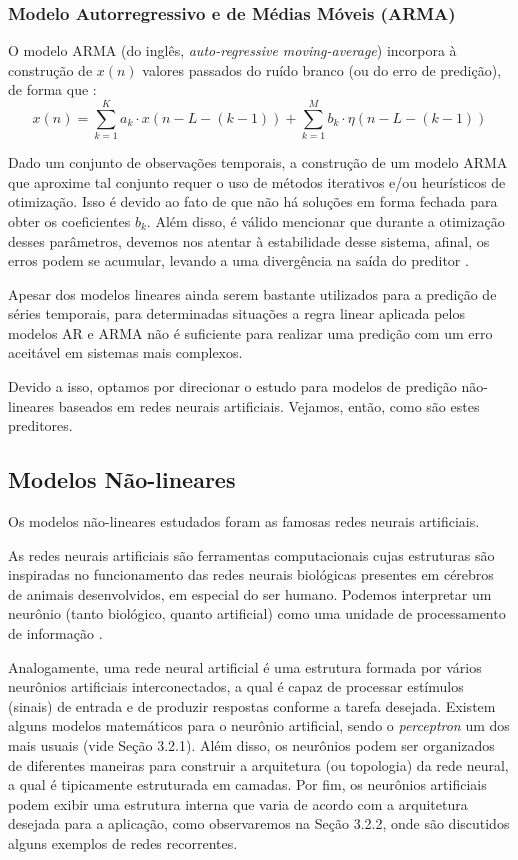 \documentclass[a4paper, 12pt]{article}
\begin{document}
\subsubsection{Modelo Autorregressivo e de Médias Móveis (ARMA)}

O modelo ARMA (do inglês, \textit{auto-regressive moving-average}) incorpora à construção de $x(n)$ valores passados do ruído branco (ou do erro de predição), de forma que \cite{box2015time}:
\begin{equation}
x(n) = \sum_{k = 1}^{K} a_{k} \cdot x(n - L - (k-1)) + \sum_{k=1}^{M} b_{k} \cdot \eta(n - L - (k-1))
\end{equation} 

Dado um conjunto de observações temporais, a construção de um modelo ARMA que aproxime tal conjunto requer o uso de métodos iterativos e/ou heurísticos de otimização. Isso é devido ao fato de que não há soluções em forma fechada para obter os coeficientes $b_k$. Além disso, é válido mencionar que durante a otimização desses parâmetros, devemos nos atentar à estabilidade desse sistema, afinal, os erros podem se acumular, levando a uma divergência na saída do preditor \cite{box2015time}.

Apesar dos modelos lineares ainda serem bastante utilizados para a predição de séries temporais, para determinadas situações a regra linear aplicada pelos modelos AR e ARMA não é suficiente para realizar uma predição com um erro aceitável em sistemas mais complexos. 

Devido a isso, optamos por direcionar o estudo para modelos de predição não-lineares baseados em redes neurais artificiais. Vejamos, então, como são estes preditores. 

\subsection{Modelos Não-lineares}

Os modelos não-lineares estudados foram as famosas redes neurais artificiais.

As redes neurais artificiais são ferramentas computacionais cujas estruturas são inspiradas no funcionamento das redes neurais biológicas presentes em cérebros de animais desenvolvidos, em especial do ser humano. Podemos interpretar um neurônio (tanto biológico, quanto artificial) como uma unidade de processamento de informação \cite{haykin2010neural}. 

Analogamente, uma rede neural artificial é uma estrutura formada por vários neurô\-nios artificiais interconectados, a qual é capaz de processar estímulos (sinais) de entrada e de produzir respostas conforme a tarefa desejada. Existem alguns modelos matemáticos para o neurônio artificial, sendo o \textit{perceptron} um dos mais usuais (vide Seção 3.2.1). Além disso, os neurônios podem ser organizados de diferentes maneiras para construir a arquitetura (ou topologia) da rede neural, a qual é tipicamente estruturada em camadas. Por fim, os neurônios artificiais podem exibir uma estrutura interna que varia de acordo com a arquitetura desejada para a aplicação, como observaremos na Seção 3.2.2, onde são discutidos alguns exemplos de redes recorrentes.
\end{document}
